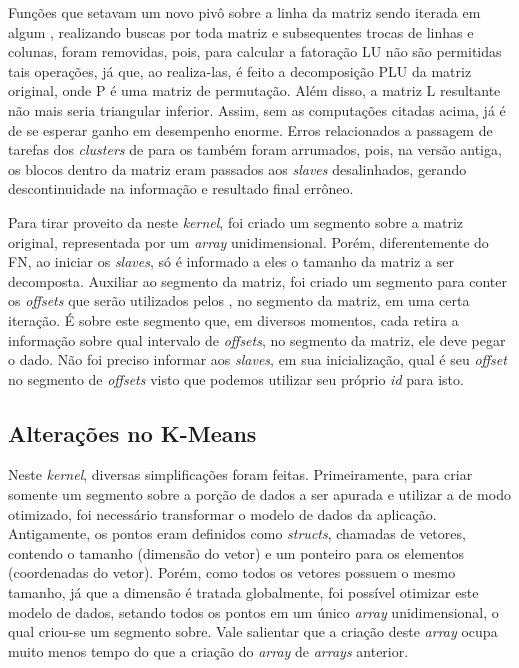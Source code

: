 \documentclass[a4paper,11pt]{article}
\begin{document}
Funções que setavam um novo pivô sobre a linha da matriz sendo iterada em algum \cc , realizando buscas por toda matriz e subsequentes trocas de linhas e colunas, foram removidas, pois, para calcular a fatoração LU não são permitidas tais operações, já que, ao realiza-las, é feito a decomposição PLU da matriz original, onde P é uma matriz de permutação. Além disso, a matriz L resultante não mais seria triangular inferior. Assim, sem as computações citadas acima, já é de se esperar ganho em desempenho enorme. Erros relacionados a passagem de tarefas dos \textit{clusters} de \io para os \ccs também foram arrumados, pois, na versão antiga, os blocos dentro da matriz eram passados aos \textit{slaves} desalinhados, gerando descontinuidade na informação e resultado final errôneo.

Para tirar proveito da \async neste \textit{kernel}, foi criado um segmento sobre a matriz original, representada por um \textit{array} unidimensional. Porém, diferentemente do FN, ao iniciar os \textit{slaves}, só é informado a eles o tamanho da matriz a ser decomposta. Auxiliar ao segmento da matriz, foi criado um segmento para conter os \textit{offsets} que serão utilizados pelos \ccs, no segmento da matriz, em uma certa iteração. É sobre este segmento que, em diversos momentos, cada \cc retira a informação sobre qual intervalo de \textit{offsets}, no segmento da matriz, ele deve pegar o dado. Não foi preciso informar aos \textit{slaves}, em sua inicialização, qual é seu \textit{offset} no segmento de \textit{offsets} visto que podemos utilizar seu próprio \textit{id} para isto.
\subsection{Alterações no K-Means}
\label{subsec:async}

Neste \textit{kernel}, diversas simplificações foram feitas. Primeiramente, para criar somente um segmento sobre a porção de dados a ser apurada e utilizar a \async de modo otimizado, foi necessário transformar o modelo de dados da aplicação. Antigamente, os pontos eram definidos como \textit{structs}, chamadas de vetores, contendo o tamanho (dimensão do vetor) e um ponteiro para os elementos (coordenadas do vetor). Porém, como todos os vetores possuem o mesmo tamanho, já que a dimensão é tratada globalmente, foi possível otimizar este modelo de dados, setando todos os pontos em um único \textit{array} unidimensional, o qual criou-se um segmento sobre. Vale salientar que a criação deste \textit{array} ocupa muito menos tempo do que a criação do \textit{array} de \textit{arrays} anterior. 
\end{document}
